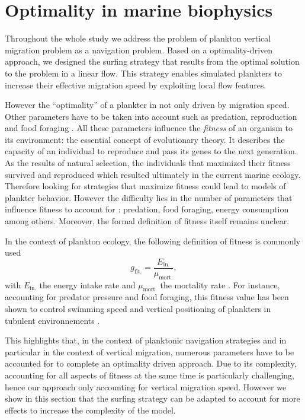 \section{Optimality in marine biophysics}\label{sec:optimality}

Throughout the whole study we address the problem of plankton vertical migration problem as a navigation problem.
Based on a optimality-driven approach, we designed the surfing strategy that results from the optimal solution to the problem in a linear flow.
This strategy enables simulated plankters to increase their effective migration speed by exploiting local flow features.

However the ``optimality'' of a plankter in not only driven by migration speed.
Other parameters have to be taken into account such as predation, reproduction and food foraging \citep{smith2011optimality}.
All these parameters influence the \textit{fitness} of an organism to its environment: the essential concept of evolutionary theory.
It describes the capacity of an individual to reproduce and pass its genes to the next generation.
As the results of natural selection, the individuals that maximized their fitness survived and reproduced which resulted ultimately in the current marine ecology.
Therefore looking for strategies that maximize fitness could lead to models of plankter behavior.
However the difficulty lies in the number of parameters that influence fitness to account for \citep{smith2011optimality}: predation, food foraging, energy consumption among others.
Moreover, the formal definition of fitness itself remains unclear.

In the context of plankton ecology, the following definition of fitness is commonly used
\begin{equation}\label{eq:fitness}
	g_{\mathrm{fit.}} = \frac{E_{\mathrm{in.}}}{\mu_{\mathrm{mort.}}},
\end{equation}
with $E_{\mathrm{in.}}$ the energy intake rate and $\mu_{\mathrm{mort.}}$ the mortality rate \citep{visser2007motility}.
For instance, accounting for predator pressure and food foraging, this fitness value has been shown to control swimming speed and vertical positioning of plankters in tubulent environnements \citep{visser2009swimming}.

This highlights that, in the context of planktonic navigation strategies and in particular in the context of vertical migration, numerous parameters have to be accounted for to complete an optimality driven approach.
Due to its complexity, accounting for all aspects of fitness at the same time is particularly challenging, hence our approach only accounting for vertical migration speed.
However we show in this section that the surfing strategy can be adapted to account for more effects to increase the complexity of the model.


